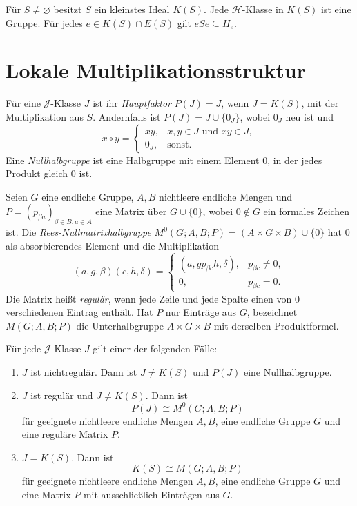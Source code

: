 \begin{theorem}
\label{b37guide:thm:kernel}
Für $S\ne\varnothing$ besitzt $S$ ein kleinstes Ideal $K(S)$.
Jede $\mathcal H$-Klasse in $K(S)$ ist eine Gruppe.
Für jedes $e\in K(S)\cap E(S)$ gilt $eSe\subseteq H_e$.
\cite{east2018}
\end{theorem}

\section{Lokale Multiplikationsstruktur}

\begin{definition}
Für eine $\mathcal J$-Klasse $J$ ist ihr \emph{Hauptfaktor}
$P(J)=J$, wenn $J=K(S)$, mit der Multiplikation aus $S$.
Andernfalls ist $P(J)=J\cup\{0_J\}$, wobei $0_J$ neu ist und
\[
x\circ y=
\begin{cases}
xy,&x,y\in J\text{ und }xy\in J,\\
0_J,&\text{sonst}.
\end{cases}
\]
Eine \emph{Nullhalbgruppe} ist eine Halbgruppe mit einem Element $0$,
in der jedes Produkt gleich $0$ ist.
\end{definition}

\clearpage
\begin{definition}
Seien $G$ eine endliche Gruppe, $A,B$ nichtleere endliche Mengen und
$P=(p_{\beta a})_{\beta\in B,a\in A}$ eine Matrix über
$G\cup\{0\}$, wobei $0\notin G$ ein formales Zeichen ist.
Die \emph{Rees-Nullmatrixhalbgruppe}
$M^0(G;A,B;P)=(A\times G\times B)\cup\{0\}$ hat $0$ als
absorbierendes Element und die Multiplikation
\[
(a,g,\beta)(c,h,\delta)=
\begin{cases}
(a,gp_{\beta c}h,\delta),&p_{\beta c}\ne0,\\
0,&p_{\beta c}=0.
\end{cases}
\]
Die Matrix heißt \emph{regulär}, wenn jede Zeile und jede Spalte
einen von $0$ verschiedenen Eintrag enthält.
Hat $P$ nur Einträge aus $G$, bezeichnet $M(G;A,B;P)$ die
Unterhalbgruppe $A\times G\times B$ mit derselben Produktformel.
\end{definition}

\begin{theorem}
\label{b37guide:thm:rees}
Für jede $\mathcal J$-Klasse $J$ gilt einer der folgenden Fälle:
\begin{enumerate}
\item $J$ ist nichtregulär. Dann ist $J\ne K(S)$ und $P(J)$ eine
Nullhalbgruppe.
\item $J$ ist regulär und $J\ne K(S)$. Dann ist
\[
P(J)\cong M^0(G;A,B;P)
\]
für geeignete nichtleere endliche Mengen $A,B$, eine endliche Gruppe
$G$ und eine reguläre Matrix $P$.
\item $J=K(S)$. Dann ist
\[
K(S)\cong M(G;A,B;P)
\]
für geeignete nichtleere endliche Mengen $A,B$, eine endliche Gruppe
$G$ und eine Matrix $P$ mit ausschließlich Einträgen aus $G$.
\end{enumerate}
\cite{rees1940,shah2016}
\end{theorem}

